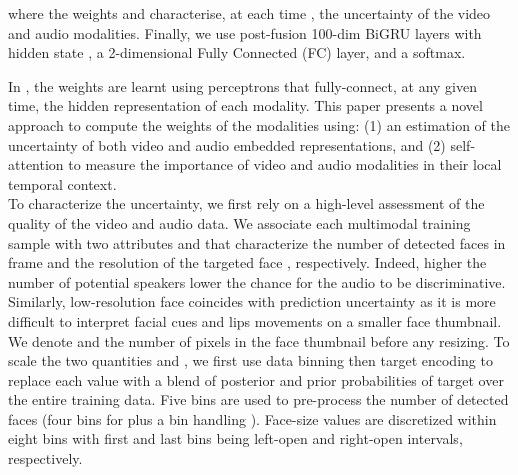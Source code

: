 \documentclass[a4paper]{article}
\begin{document}
where the weights  and  characterise, at each time , the uncertainty of the video and audio modalities. Finally, we use post-fusion 100-dim BiGRU layers with hidden state , a \mbox{2-dimensional} Fully Connected (FC) layer, and a softmax.

In \cite{fusion_before_melissa, melissa}, the  weights are learnt using perceptrons that fully-connect, at any given time, the hidden representation of each modality.
This paper presents a novel approach to compute the weights of the modalities using: (1) an estimation of the uncertainty of both video and audio embedded representations, and (2) self-attention to measure the importance of video and audio modalities in their local temporal context.\\

 To characterize the uncertainty, we first rely on a high-level assessment of the quality of the video and audio data. We associate each multimodal training sample  with two attributes  and  that characterize the number of detected faces in frame  and the resolution of the targeted face , respectively. Indeed, higher the number of potential speakers lower the chance for the audio to be discriminative. Similarly, low-resolution face coincides with prediction uncertainty as it is more difficult to interpret facial cues and lips movements on a smaller face thumbnail. We denote  and  the number of pixels in the face thumbnail  before any resizing. To scale the two quantities  and , we first use data binning then target encoding \cite{target_encoding} to replace each value with a blend of posterior and prior probabilities of target over the entire training data. Five bins are used to pre-process the number of detected faces (four bins for  plus a bin handling ). Face-size values are discretized within eight bins with first and last bins being left-open and right-open intervals, respectively.\\
\end{document}

